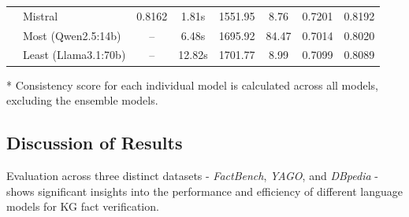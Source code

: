 \begin{table}[ht!]
{\begin{threeparttable}
\begin{tabular}{llcccc||cc}
                                            & Mistral                            & 0.8162                         & 1.81s                            & 1551.95                                       & 8.76             & 0.7201    & 0.8192   \\ \cline{2-8}
                                            & Most (Qwen2.5:14b)                 & --                             & 6.48s                            & 1695.92                                       & 84.47            & 0.7014    & 0.8020   \\
                                            & Least (Llama3.1:70b)               & --                             & 12.82s                           & 1701.77                                       & 8.99             & 0.7099    & 0.8089   \\
                \bottomrule
            \end{tabular}
            \begin{tablenotes}
                \item[*] Consistency score for each individual model is calculated across all models, excluding the ensemble models.
            \end{tablenotes}
        \end{threeparttable}}
    \label{tab:evaluation_results-full-wo-category-all-datasets}
\end{table}

\subsection{Discussion of Results}\label{subsec:discussion-of-results}
Evaluation across three distinct datasets - \textit{FactBench}, \textit{YAGO}, and \textit{DBpedia} - shows significant insights into the performance and efficiency of different language models for \ac{KG} fact verification.

